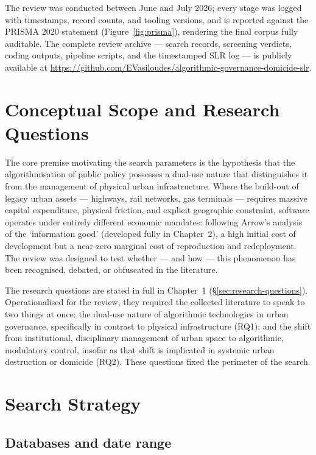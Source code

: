 The review was conducted between June and July 2026; every stage was logged with timestamps, record counts, and tooling versions, and is reported against the PRISMA 2020 statement \parencite{page2021} (Figure~\ref{fig:prisma}), rendering the final corpus fully auditable. The complete review archive — search records, screening verdicts, coding outputs, pipeline scripts, and the timestamped SLR log — is publicly available at \url{https://github.com/EVasiloudes/algorithmic-governance-domicide-slr}.

\section{Conceptual Scope and Research Questions}
\label{sec:conceptual-scope}

The core premise motivating the search parameters is the hypothesis that the algorithmisation of public policy possesses a dual-use nature that distinguishes it from the management of physical urban infrastructure. Where the build-out of legacy urban assets — highways, rail networks, gas terminals — requires massive capital expenditure, physical friction, and explicit geographic constraint, software operates under entirely different economic mandates: following Arrow's \citeyearpar[pp.~609--610]{arrow1962} analysis of the `information good' (developed fully in Chapter~2), a high initial cost of development but a near-zero marginal cost of reproduction and redeployment. The review was designed to test whether — and how — this phenomenon has been recognised, debated, or obfuscated in the literature.

The research questions are stated in full in Chapter~1 (§\ref{sec:research-questions}). Operationalised for the review, they required the collected literature to speak to two things at once: the dual-use nature of algorithmic technologies in urban governance, specifically in contrast to physical infrastructure (RQ1); and the shift from institutional, disciplinary management of urban space to algorithmic, modulatory control, insofar as that shift is implicated in systemic urban destruction or domicide (RQ2). These questions fixed the perimeter of the search.

\section{Search Strategy}
\label{sec:search-strategy}

\subsection{Databases and date range}

